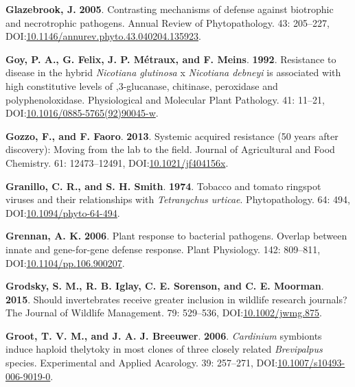 \documentclass[12pt,final,CPage]{ufthesis}
\newlength{\cslhangindent}
\newenvironment{CSLReferences}[2] %
{%
	\setlength{\parindent}{0pt}
	\ifodd #1 \everypar{\setlength{\hangindent}{\cslhangindent}}\ignorespaces\fi
	\ifnum #2 > 0
	\setlength{\parskip}{#2\baselineskip}
	\fi
}%
{}
\begin{document}
{\begin{CSLReferences}{1}{0}
  \leavevmode{}%
  \textbf{Glazebrook, J.} \textbf{2005}. Contrasting mechanisms of defense against biotrophic and necrotrophic pathogens. Annual Review of Phytopathology. 43: 205--227, DOI:\href{https://doi.org/10.1146/annurev.phyto.43.040204.135923}{10.1146/annurev.phyto.43.040204.135923}.

  \leavevmode{}%
  \textbf{Goy, P. A., G. Felix, J. P. Métraux, and F. Meins}. \textbf{1992}. Resistance to disease in the hybrid {\emph{Nicotiana glutinosa}} x {\emph{Nicotiana debneyi}} is associated with high constitutive levels of ,3-glucanase, chitinase, peroxidase and polyphenoloxidase. Physiological and Molecular Plant Pathology. 41: 11--21, DOI:\href{https://doi.org/10.1016/0885-5765(92)90045-w}{10.1016/0885-5765(92)90045-w}.

  \leavevmode{}%
  \textbf{Gozzo, F., and F. Faoro}. \textbf{2013}. Systemic acquired resistance (50 years after discovery): Moving from the lab to the field. Journal of Agricultural and Food Chemistry. 61: 12473--12491, DOI:\href{https://doi.org/10.1021/jf404156x}{10.1021/jf404156x}.

  \leavevmode{}%
  \textbf{Granillo, C. R., and S. H. Smith}. \textbf{1974}. Tobacco and tomato ringspot viruses and their relationships with {\emph{Tetranychus urticae}}. Phytopathology. 64: 494, DOI:\href{https://doi.org/10.1094/phyto-64-494}{10.1094/phyto-64-494}.

  \leavevmode{}%
  \textbf{Grennan, A. K.} \textbf{2006}. Plant response to bacterial pathogens. Overlap between innate and gene-for-gene defense response. Plant Physiology. 142: 809--811, DOI:\href{https://doi.org/10.1104/pp.106.900207}{10.1104/pp.106.900207}.

  \leavevmode{}%
  \textbf{Grodsky, S. M., R. B. Iglay, C. E. Sorenson, and C. E. Moorman}. \textbf{2015}. Should invertebrates receive greater inclusion in wildlife research journals? The Journal of Wildlife Management. 79: 529--536, DOI:\href{https://doi.org/10.1002/jwmg.875}{10.1002/jwmg.875}.

  \leavevmode{}%
  \textbf{Groot, T. V. M., and J. A. J. Breeuwer}. \textbf{2006}. \emph{Cardinium} symbionts induce haploid thelytoky in most clones of three closely related {\emph{Brevipalpus}} species. Experimental and Applied Acarology. 39: 257--271, DOI:\href{https://doi.org/10.1007/s10493-006-9019-0}{10.1007/s10493-006-9019-0}.


\end{CSLReferences}}
\end{document}
